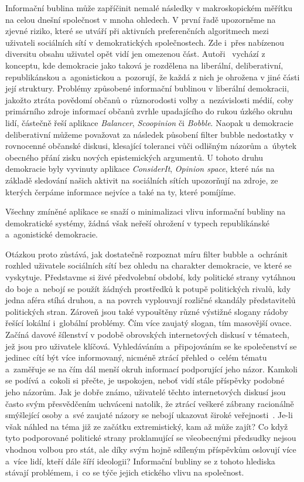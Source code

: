 \documentclass[12pt, a4paper]{article}
\numberwithin{equation}{section} 	%
\begin{document}
Informační bublina může zapříčinit nemalé následky v makroskopickém mě\-ří\-tku na celou dnešní společnost v mnoha ohledech. V první řadě upozorněme na zjevné riziko, které se utváří při aktivních preferenčních algoritmech mezi uživateli sociálních sítí v demokratických společnostech. Zde i~přes nabízenou diversitu obsahu uživatel opět vidí jen omezenou část. Autoři~\cite{BreakingTheFilterBubble} vychází z konceptu, kde demokracie jako taková je rozdělena na liberální, deliberativní, republikánskou a~agonistickou a~pozorují, že každá z nich je ohrožena v jiné části její struktury. Problémy způsobené informační bublinou v liberální demokracii, jakožto ztráta povědomí občanů o~různorodosti volby a~nezávislosti médií, coby primárního zdroje informací občanů zvrhle upadajícího do rukou úzkého okruhu lidí, částečně řeší aplikace \textit{Balancer}, \textit{Scoopinion} či \textit{Bobble}.
Naopak u demokracie deliberativní můžeme považovat za následek působení filter bubble nedostatky v rovnocenné občanské diskusi, klesající toleranci vůči odlišným názorům a~úbytek obecného přání zisku nových epistemických argumentů. U tohoto druhu demokracie byly vyvinuty aplikace \textit{ConsiderIt}, \textit{Opinion space}, které nás na základě sledování našich aktivit na sociálních sítích upozorňují na zdroje, ze kterých čerpáme informace nejvíce a také na ty, které pomíjíme.

Všechny zmíněné aplikace se snaží o minimalizaci vlivu informační bubliny na demokratické systémy, žádná však neřeší ohrožení v typech republikánské a~agonistické demokracie.

Otázkou proto zůstává, jak dostatečně rozpoznat míru filter bubble a~ochránit rozhled uživatele sociálních sítí bez ohledu na charakter demokracie, ve které se vyskytuje. Představme si živé předvolební období, kdy politické strany vytáhnou do boje a~nebojí se použít žádných prostředků k potupě politických rivalů, kdy jedna aféra stíhá druhou, a~na povrch vyplouvají rozličné skandály představitelů politických stran. Zároveň jsou také vypouštěny různé výstižné slogany rádoby řešící lokální i~globální problémy. Čím více zaujatý slogan, tím masovější ovace. Začíná davové šílenství v podobě obrovských internetových diskusí v tématech, jež jsou pro uživatele klíčová. Vyhledáváním a~připojováním se ke společenství se jedinec cítí být více informovaný, nicméně ztrácí přehled o~celém tématu a~zaměřuje se na čím dál menší okruh informací podporující jeho názor. Kamkoli se podívá a~cokoli si přečte, je uspokojen, neboť vidí stále příspěvky podobné jeho názorům. Jak je dobře známo, uživatelé těchto internetových diskusí jsou často svým přesvědčením uchváceni natolik, že ztrácí veškeré zábrany racionálně smýšlející osoby a~své zaujaté názory se nebojí ukazovat široké veřejnosti~\cite{DemocracyOnline}. Je-li však náhled na téma již ze začátku extremistický, kam až může zajít? Co když tyto podporované politické strany proklamující se všeobecnými předsudky nejsou vhodnou volbou pro stát, ale díky svým hojně sdíleným příspěvkům oslovují více a~více lidí, kteří dále šíří ideologii? Informační bubliny se z tohoto hlediska stávají problémem, i~co se týče jejich etického vlivu na společnost.
\end{document}
